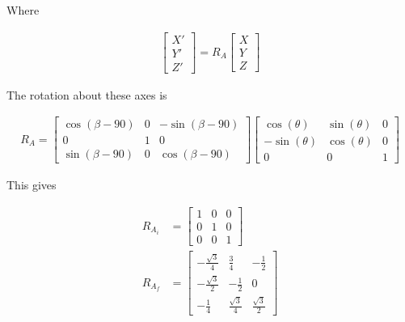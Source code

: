 \documentclass[12pt, letterpaper]{../assignment}
\begin{document}
Where

\begin{equation*}
    \begin{aligned}
        \left[\begin{array}{c} X' \\ Y' \\ Z' \end{array}\right] =
        R_A \left[\begin{array}{c} X \\ Y \\ Z \end{array}\right]   
    \end{aligned}
\end{equation*}

The rotation about these axes is

\begin{equation*}
    \begin{aligned}
        R_A =  \left[\begin{array}{ccc} \cos\left(\beta-90\right) & 0 & -\sin\left(\beta-90\right)\\ 0 & 1 & 0\\ \sin\left(\beta-90\right) & 0 & \cos\left(\beta-90\right) \end{array}\right]
        \left[\begin{array}{ccc} \cos\left(\theta\right) & \sin\left(\theta\right) & 0\\ -\sin\left(\theta\right) & \cos\left(\theta\right) & 0\\ 0 & 0 & 1 \end{array}\right]
    \end{aligned}
\end{equation*}

This gives

\begin{equation*}
\begin{aligned}
    R_{A_i} &= \left[\begin{array}{ccc} 1 & 0 & 0\\ 0 & 1 & 0\\ 0 & 0 & 1 \end{array}\right]\\
    R_{A_f} &= \left[\begin{array}{ccc} -\frac{\sqrt{3}}{4} & \frac{3}{4} & -\frac{1}{2}\\ -\frac{\sqrt{3}}{2} & -\frac{1}{2} & 0\\ -\frac{1}{4} & \frac{\sqrt{3}}{4} & \frac{\sqrt{3}}{2} \end{array}\right]
\end{aligned}
\end{equation*}
\end{document}
